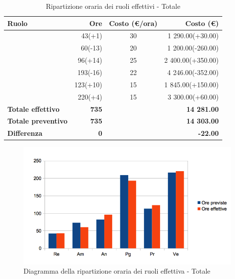 \documentclass[12pt,a4paper]{article}
\begin{document}
\begin{table}[H]
	\begin{center}
		\begin{tabular}{l r c r}
			\toprule
			\textbf{Ruolo}	& \textbf{Ore} & \textbf{Costo (\euro/ora)}	& \textbf{Costo (\euro)} \\ \midrule
			\midrule	
			\RE{} & 43(+1) 		& 30 & 1 290.00(+30.00) \\ \midrule
			\AM{} & 60(-13)		& 20 & 1 200.00(-260.00) \\ \midrule
			\AN{} & 96(+14)		& 25 & 2 400.00(+350.00) \\ \midrule
			\PG{} & 193(-16)	& 22 & 4 246.00(-352.00) \\ \midrule
			\PR{} & 123(+10)	& 15 & 1 845.00(+150.00) \\ \midrule
			\VR{} & 220(+4)		& 15 & 3 300.00(+60.00) \\ \midrule
			\textbf{Totale effettivo} & \textbf{735} &  & \textbf{14 281.00} \\ \midrule
			\textbf{Totale preventivo} & \textbf{735} &  & \textbf{14 303.00} \\ \midrule
			\textbf{Differenza} & \textbf{0} &  & \textbf{-22.00} \\ \midrule			
			\bottomrule
		\end{tabular}
		\caption{Ripartizione oraria dei ruoli effettivi - Totale}
	\end{center}
\end{table}

\begin{center}
	\begin{figure}[H]
		\centering
		\includegraphics[width=\textwidth]{../img/diagrammaBarreTotaleConsuntivo.png}
		\caption{Diagramma della ripartizione oraria dei ruoli effettiva - Totale}
	\end{figure}
\end{center}
\end{document}
